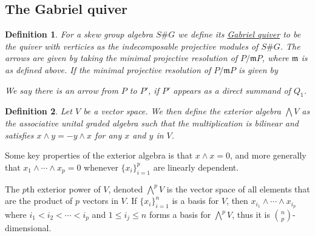 \documentclass[11pt, a4paper, english]{article}
\numberwithin{prop}{section}
\numberwithin{lemma}{section}
\numberwithin{theorem}{section}
\newtheorem{defin}{Definition}
\numberwithin{defin}{section}
\numberwithin{example}{section}
\begin{document}
\subsection{The Gabriel quiver}

\begin{defin}
For a skew group algebra $S\#G$ we define its \underline{Gabriel quiver} to be the quiver with verticies as the indecomposable projective modules of $S\#G$. The arrows are given by taking the minimal projective resolution of $P/\mathfrak{m}P$, where $\mathfrak{m}$ is as defined above. If the minimal projective resolution of $P/\mathfrak{m}P$ is given by
\begin{center}
\end{center}
We say there is an arrow from $P$ to $P'$, if $P'$ appears as a direct summand of $Q_1$.
\end{defin}

\begin{defin}
Let $V$ be a vector space. We then define the exterior algebra $\bigwedge V$ as the associative unital graded algebra such that the multiplication is bilinear and satisfies $x \wedge y = -y \wedge x$ for any $x$ and $y$ in $V$. 
\end{defin}
Some key properties of the exterior algebra is that $x \wedge x = 0$, and more generally that $x_1 \wedge \cdots \wedge x_p = 0$ whenever $\{x_i\}_{i=1}^p$ are linearly dependent.

The $p$th exterior power of $V$, denoted $\bigwedge\limits^p V$ is the vector space of all elements that are the product of $p$ vectors in $V$. If $\{ x_i \}_{i=1}^n$ is a basis for $V$, then $x_{i_1} \wedge \cdots \wedge x_{i_p}$ where $i_1 < i_2 < \cdots < i_p$ and $1 \leq i_j \leq n$ forms a basis for $\bigwedge\limits^p V$, thus it is ${n \choose p}$-dimensional.  
\end{document}
